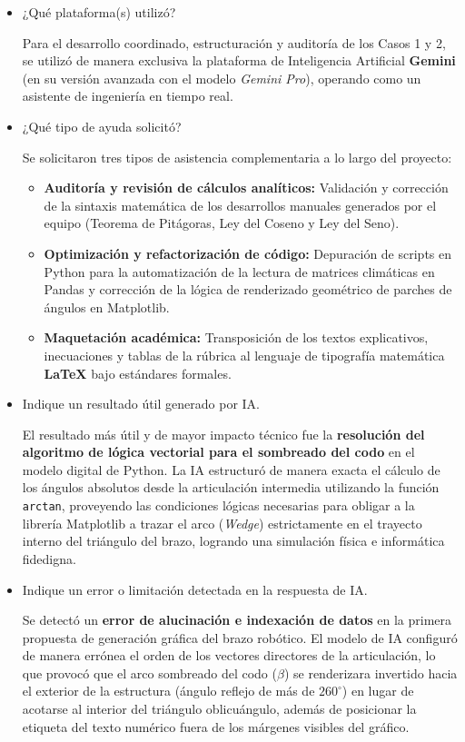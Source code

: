 \documentclass[12pt]{article}
\begin{document}
\begin{itemize}
	\item[a)] ¿Qué plataforma(s) utilizó?
	
	Para el desarrollo coordinado, estructuración y auditoría de los Casos 1 y 2, se utilizó de manera exclusiva la plataforma de Inteligencia Artificial \textbf{Gemini} (en su versión avanzada con el modelo \textit{Gemini Pro}), operando como un asistente de ingeniería en tiempo real.
	
	\item[b)] ¿Qué tipo de ayuda solicitó?
	
	Se solicitaron tres tipos de asistencia complementaria a lo largo del proyecto:
    \begin{itemize}
        \item \textbf{Auditoría y revisión de cálculos analíticos:} Validación y corrección de la sintaxis matemática de los desarrollos manuales generados por el equipo (Teorema de Pitágoras, Ley del Coseno y Ley del Seno).
        \item \textbf{Optimización y refactorización de código:} Depuración de scripts en Python para la automatización de la lectura de matrices climáticas en Pandas y corrección de la lógica de renderizado geométrico de parches de ángulos en Matplotlib.
        \item \textbf{Maquetación académica:} Transposición de los textos explicativos, inecuaciones y tablas de la rúbrica al lenguaje de tipografía matemática \textbf{LaTeX} bajo estándares formales.
    \end{itemize}
    
	\item[c)] Indique un resultado útil generado por IA.
	
	El resultado más útil y de mayor impacto técnico fue la \textbf{resolución del algoritmo de lógica vectorial para el sombreado del codo} en el modelo digital de Python. La IA estructuró de manera exacta el cálculo de los ángulos absolutos desde la articulación intermedia utilizando la función \texttt{arctan}, proveyendo las condiciones lógicas necesarias para obligar a la librería Matplotlib a trazar el arco (\textit{Wedge}) estrictamente en el trayecto interno del triángulo del brazo, logrando una simulación física e informática fidedigna.
	
	\item[d)] Indique un error o limitación detectada en la respuesta de IA.
	
	Se detectó un \textbf{error de alucinación e indexación de datos} en la primera propuesta de generación gráfica del brazo robótico. El modelo de IA configuró de manera errónea el orden de los vectores directores de la articulación, lo que provocó que el arco sombreado del codo ($\beta$) se renderizara invertido hacia el exterior de la estructura (ángulo reflejo de más de $260^\circ$) en lugar de acotarse al interior del triángulo oblicuángulo, además de posicionar la etiqueta del texto numérico fuera de los márgenes visibles del gráfico.
	

\end{itemize}
\end{document}
